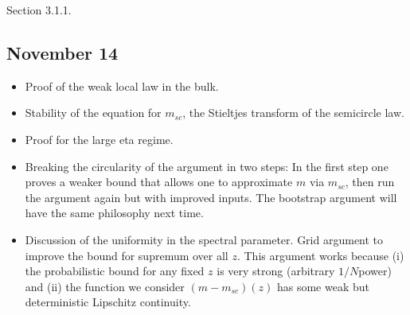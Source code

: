 \documentclass[letterpaper,10pt,english]{sphinxhowto}
\begin{document}
\sphinxAtStartPar
{}  Section 3.1.1.


\subsection{November 14}
\label{\detokenize{teaching/random_matrices_2017:november-14}}\begin{itemize}
\item {} 
\sphinxAtStartPar
Proof of the weak local law in the bulk.

\item {} 
\sphinxAtStartPar
Stability of the equation for \(m_{sc}\), the Stieltjes transform of the semicircle law.

\item {} 
\sphinxAtStartPar
Proof for the large eta regime.

\item {} 
\sphinxAtStartPar
Breaking the circularity of the argument in two steps: In the first step one proves a weaker bound that allows one to approximate \(m\) via \(m_{sc}\), then run the argument again but with improved inputs. The bootstrap argument will have the same philosophy next time.

\item {} 
\sphinxAtStartPar
Discussion of the uniformity in the spectral parameter. Grid argument to improve the bound for supremum over all \(z\). This argument works because (i) the probabilistic bound for any fixed \(z\) is very strong (arbitrary \(1/N\)\sphinxhyphen{}power) and (ii) the function we consider \((m-m_{sc})(z)\) has some weak but deterministic Lipschitz continuity.

\end{itemize}
\end{document}

